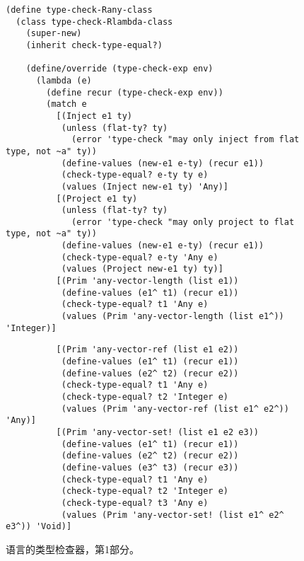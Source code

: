 \documentclass[11pt]{book}
\begin{document}
\begin{figure}[btp]
 \begin{lstlisting}
(define type-check-Rany-class
  (class type-check-Rlambda-class
    (super-new)
    (inherit check-type-equal?)

    (define/override (type-check-exp env)
      (lambda (e)
        (define recur (type-check-exp env))
        (match e
          [(Inject e1 ty)
           (unless (flat-ty? ty)
             (error 'type-check "may only inject from flat type, not ~a" ty))
           (define-values (new-e1 e-ty) (recur e1))
           (check-type-equal? e-ty ty e)
           (values (Inject new-e1 ty) 'Any)]
          [(Project e1 ty)
           (unless (flat-ty? ty)
             (error 'type-check "may only project to flat type, not ~a" ty))
           (define-values (new-e1 e-ty) (recur e1))
           (check-type-equal? e-ty 'Any e)
           (values (Project new-e1 ty) ty)]
          [(Prim 'any-vector-length (list e1))
           (define-values (e1^ t1) (recur e1))
           (check-type-equal? t1 'Any e)
           (values (Prim 'any-vector-length (list e1^)) 'Integer)]
\end{lstlisting}
\end{figure}
\begin{figure}[tbp]
\begin{lstlisting}           
          [(Prim 'any-vector-ref (list e1 e2))
           (define-values (e1^ t1) (recur e1))
           (define-values (e2^ t2) (recur e2))
           (check-type-equal? t1 'Any e)
           (check-type-equal? t2 'Integer e)
           (values (Prim 'any-vector-ref (list e1^ e2^)) 'Any)]
          [(Prim 'any-vector-set! (list e1 e2 e3))
           (define-values (e1^ t1) (recur e1))
           (define-values (e2^ t2) (recur e2))
           (define-values (e3^ t3) (recur e3))
           (check-type-equal? t1 'Any e)
           (check-type-equal? t2 'Integer e)
           (check-type-equal? t3 'Any e)
           (values (Prim 'any-vector-set! (list e1^ e2^ e3^)) 'Void)]
\end{lstlisting}
\caption{ \LangAny{} 语言的类型检查器，第1部分。}
\label{fig:type-check-Rany-part-1}
\end{figure}
\end{document}
